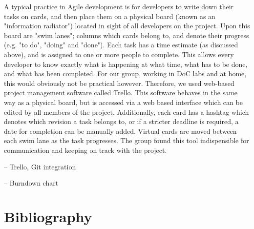\documentclass[a4wide, 11pt]{article} \usepackage{a4, fullpage}
\begin{document}
A typical practice in Agile development is for developers to write down their
tasks on cards, and then place them on a physical board (known as an
"information radiator") located in sight of all developers on the project. 
Upon this board are "swim lanes"; columns which cards belong to, and denote 
their progress (e.g. "to do", "doing" and "done"). Each task has a time 
estimate (as discussed above), and is assigned to one or more people to complete.
This allows every developer to know exactly what is happening at what time,
what has to be done, and what has been completed. For our group, working in 
DoC labs and at home, this would obviously not be practical however. Therefore,
we used web-based project management software called Trello. This software
behaves in the same way as a physical board, but is accessed via a web based
interface which can be edited by all members of the project. Additionally, each
card has a hashtag which denotes which revision a task belongs to, or if a
stricter deadline is required, a date for completion can be manually added.
Virtual cards are moved between each swim lane as the task progresses. The
group found this tool indispensible for communication and keeping on track with
the project.



-- Trello, Git integration

-- Burndown chart


\section{Bibliography}
\end{document}
